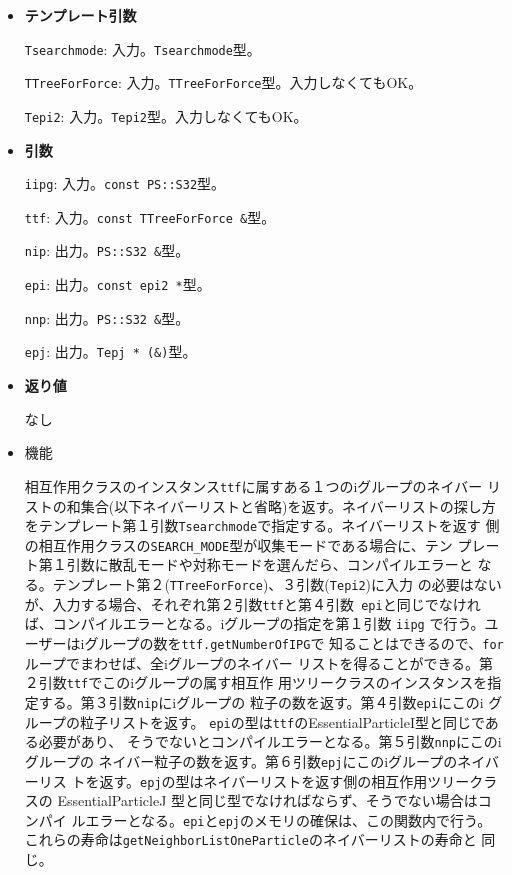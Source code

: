 \begin{itemize}

\item{{\bf テンプレート引数}}

{\tt Tsearchmode}: 入力。{\tt Tsearchmode}型。

{\tt TTreeForForce}: 入力。{\tt TTreeForForce}型。入力しなくてもOK。

{\tt Tepi2}: 入力。{\tt Tepi2}型。入力しなくてもOK。

\item{{\bf 引数}}

{\tt iipg}: 入力。{\tt const PS::S32}型。

{\tt ttf}: 入力。{\tt const TTreeForForce \&}型。

{\tt nip}: 出力。{\tt PS::S32 \&}型。

{\tt epi}: 出力。{\tt const epi2 *}型。

{\tt nnp}: 出力。{\tt PS::S32 \&}型。

{\tt epj}: 出力。{\tt Tepj * (\&)}型。

\item{{\bf 返り値}}

なし

\item 機能

相互作用クラスのインスタンス{\tt ttf}に属すある１つのiグループのネイバー
リストの和集合(以下ネイバーリストと省略)を返す。ネイバーリストの探し方
をテンプレート第１引数{\tt Tsearchmode}で指定する。ネイバーリストを返す
側の相互作用クラスの{\tt SEARCH\_MODE}型が収集モードである場合に、テン
プレート第１引数に散乱モードや対称モードを選んだら、コンパイルエラーと
なる。テンプレート第２({\tt TTreeForForce})、３引数({\tt Tepi2})に入力
の必要はないが、入力する場合、それぞれ第２引数{\tt ttf}と第４引数{\tt
epi}と同じでなければ、コンパイルエラーとなる。iグループの指定を第１引数
{\tt iipg} で行う。ユーザーはiグループの数を{\tt ttf.getNumberOfIPG}で
知ることはできるので、{\tt for}ループでまわせば、全iグループのネイバー
リストを得ることができる。第２引数{\tt ttf}でこのiグループの属す相互作
用ツリークラスのインスタンスを指定する。第３引数{\tt nip}にiグループの
粒子の数を返す。第４引数{\tt epi}にこのi グループの粒子リストを返す。
{\tt epi}の型は{\tt ttf}のEssentialParticleI型と同じである必要があり、
そうでないとコンパイルエラーとなる。第５引数{\tt nnp}にこのiグループの
ネイバー粒子の数を返す。第６引数{\tt epj}にこのiグループのネイバーリス
トを返す。{\tt epj}の型はネイバーリストを返す側の相互作用ツリークラスの
EssentialParticleJ 型と同じ型でなければならず、そうでない場合はコンパイ
ルエラーとなる。{\tt epi}と{\tt epj}のメモリの確保は、この関数内で行う。
これらの寿命は{\tt getNeighborListOneParticle}のネイバーリストの寿命と
同じ。

\end{itemize}

